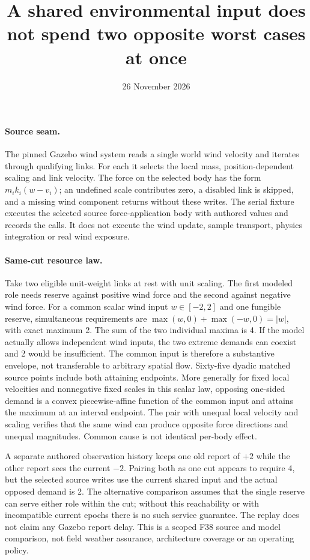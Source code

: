 \documentclass[11pt]{article}
\title{A shared environmental input does not spend two opposite worst cases at once}
\date{26 November 2026}
\begin{document}
\maketitle
\paragraph{Source seam.}
The pinned Gazebo wind system reads a single world wind velocity
and iterates through qualifying links. For each it selects the
local mass, position-dependent scaling and link velocity.
The force on the selected body has the form
$m_i k_i(w-v_i)$; an undefined scale contributes zero, a disabled
link is skipped, and a missing wind component returns without
these writes. The serial fixture executes the selected source
force-application body with authored values and records the calls.
It does not execute the wind update, sample transport, physics
integration or real wind exposure.

\paragraph{Same-cut resource law.}
Take two eligible unit-weight links at rest with unit scaling.
The first modeled role needs reserve against positive wind force
and the second against negative wind force. For a common scalar
wind input $w\in[-2,2]$ and one fungible reserve, simultaneous
requirements are $\max(w,0)+\max(-w,0)=|w|$, with exact maximum 2.
The sum of the two individual maxima is 4. If the model actually
allows independent wind inputs, the two extreme demands can
coexist and 2 would be insufficient. The common input is
therefore a substantive envelope, not transferable to arbitrary
spatial flow. Sixty-five dyadic matched source points include
both attaining endpoints. More generally for fixed local
velocities and nonnegative fixed scales in this scalar law,
opposing one-sided demand is a convex piecewise-affine function of
the common input and attains the maximum at an interval endpoint.
The pair with unequal local velocity and scaling verifies that
the same wind can produce opposite force directions and unequal
magnitudes. Common cause is not identical per-body effect.

A separate authored observation history keeps one old report of
$+2$ while the other report sees the current $-2$. Pairing both
as one cut appears to require 4, but the selected source writes
use the current shared input and the actual opposed demand is 2.
The alternative comparison assumes that the single reserve can
serve either role within the cut; without this reachability
or with incompatible current epochs there is no such service
guarantee. The replay does not claim any Gazebo report delay.
This is a scoped F38 source and model comparison, not field
weather assurance, architecture coverage or an operating policy.
\end{document}
